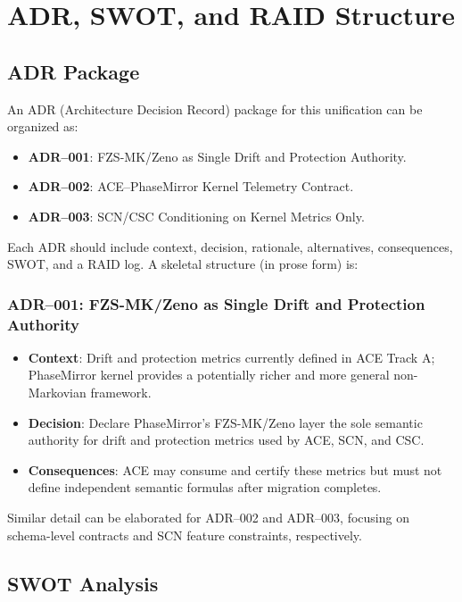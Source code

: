 \documentclass[11pt]{article}
\begin{document}
\section{ADR, SWOT, and RAID Structure}

\subsection{ADR Package}

An ADR (Architecture Decision Record) package for this unification can be organized as:
\begin{itemize}[leftmargin=*]
  \item \textbf{ADR--001}: FZS-MK/Zeno as Single Drift and Protection Authority.
  \item \textbf{ADR--002}: ACE--PhaseMirror Kernel Telemetry Contract.
  \item \textbf{ADR--003}: SCN/CSC Conditioning on Kernel Metrics Only.
\end{itemize}

Each ADR should include context, decision, rationale, alternatives, consequences, SWOT, and a RAID log. A skeletal structure (in prose form) is:

\subsubsection*{ADR--001: FZS-MK/Zeno as Single Drift and Protection Authority}

\begin{itemize}[leftmargin=*]
  \item \textbf{Context}: Drift and protection metrics currently defined in ACE Track A; PhaseMirror kernel provides a potentially richer and more general non-Markovian framework.
  \item \textbf{Decision}: Declare PhaseMirror's FZS-MK/Zeno layer the sole semantic authority for drift and protection metrics used by ACE, SCN, and CSC.
  \item \textbf{Consequences}: ACE may consume and certify these metrics but must not define independent semantic formulas after migration completes.
\end{itemize}

Similar detail can be elaborated for ADR--002 and ADR--003, focusing on schema-level contracts and SCN feature constraints, respectively.

\subsection{SWOT Analysis}
\end{document}
